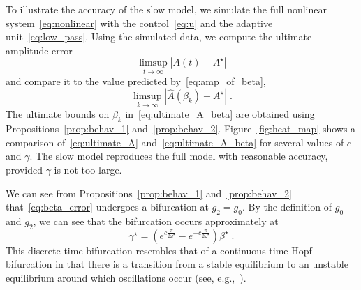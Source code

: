 \documentclass{article}
\newcommand{\AC}{\mathcal{A}}
\newcommand{\rd}{\mathrm{d}}
\theoremstyle{definition}
\theoremstyle{remark}
\begin{document}
To illustrate the accuracy of the slow model, we simulate the full nonlinear system~\eqref{eq:nonlinear} with the control~\eqref{eq:u} and the adaptive unit~\eqref{eq:low_pass}. Using the simulated data, we compute the ultimate amplitude error
\begin{equation} \label{eq:ultimate_A}
    \limsup_{t \to \infty} |A(t) - A^\star|
\end{equation}
and compare it to the value predicted by~\eqref{eq:amp_of_beta},
\begin{equation} \label{eq:ultimate_A_beta}
    \limsup_{k \to \infty} |\hat{A}(\beta_k) - A^\star| \;.
\end{equation}
The ultimate bounds on $\beta_k$ in~\eqref{eq:ultimate_A_beta} are obtained using Propositions~\ref{prop:behav_1} and~\ref{prop:behav_2}. Figure~\ref{fig:heat_map} shows a comparison of~\eqref{eq:ultimate_A} and~\eqref{eq:ultimate_A_beta} for several values of $c$ and $\gamma$. The slow model reproduces the full model with reasonable accuracy, provided $\gamma$ is not too large.

We can see from Propositions~\ref{prop:behav_1} and~\ref{prop:behav_2} that~\eqref{eq:beta_error} undergoes a bifurcation at $g_2 = g_0$. By the definition of $g_0$ and $g_2$, we can see that the bifurcation occurs approximately at
\begin{displaymath}
    \gamma^\star = (e^{c\frac{\pi}{2\omega^\star}} - e^{-c\frac{\pi}{2\omega^\star}}) \beta^\star \;.
\end{displaymath}
This discrete-time bifurcation resembles that of a continuous-time Hopf bifurcation in that there is a transition from a stable equilibrium to an unstable equilibrium around which oscillations occur (see, e.g.,~\cite{guckenheimer}). 
\end{document}
